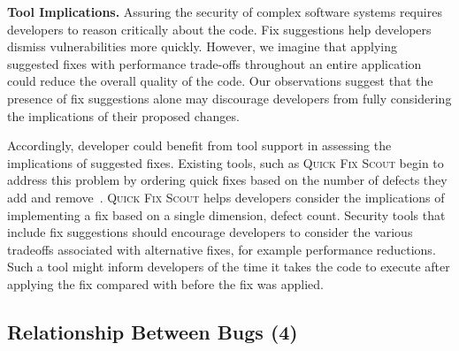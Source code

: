 \documentclass[conference]{IEEEtran}
\begin{document}

\noindent\textbf{Tool Implications.}
Assuring the security of complex software systems requires developers to reason critically about the code. 
Fix suggestions help developers dismiss vulnerabilities more quickly.
However, we imagine that applying suggested fixes with performance trade-offs throughout an entire application could reduce the overall quality of the code.
Our observations suggest that the presence of fix suggestions alone may discourage developers from fully considering the implications of their proposed changes.

Accordingly, developer could benefit from tool support in assessing the implications of suggested fixes.
Existing tools, such as \textsc{Quick Fix Scout} begin to address this problem by ordering quick fixes based on the number of defects they add and remove~\cite{mucslu2012speculative}.
\textsc{Quick Fix Scout} helps developers consider the implications of implementing a fix based on a single dimension, defect count.
Security tools that include fix suggestions should encourage developers to consider the various tradeoffs associated with alternative fixes, for example performance reductions.
Such a tool might inform developers of the time it takes the code to execute after applying the fix compared with before the fix was applied.



\noindent\subsection{\textbf{Relationship Between Bugs (4)}}\label{rbb}
\end{document}
